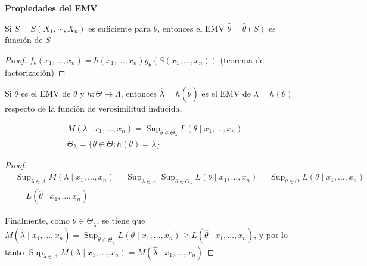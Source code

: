 \textbf{Propiedades del EMV}

\begin{proposición}
Si $S=S\left(X_{1}, \cdots, X_{n}\right)$ es suficiente para $\theta$, entonces el EMV $\hat{\theta}=\hat{\theta}(S)$ es función de $S$
\end{proposición}

\begin{proof}
  $f_{\theta}\left(x_{1}, \ldots, x_{n}\right)=h\left(x_{1}, \ldots, x_{n}\right) g_{\theta}\left(S\left(x_{1}, \ldots, x_{n}\right)\right)$ (teorema de factorización)
\end{proof}

\begin{proposición}
Si $\hat{\theta}$ es el EMV de $\theta$ y $h: \Theta \longrightarrow \Lambda$, entonces $\hat{\lambda}=h(\hat{\theta})$ es el EMV de $\lambda=h(\theta)$ respecto de la función de verosimilitud inducida,

$$
  \begin{gathered}
    M\left(\lambda \mid x_{1}, \ldots, x_{n}\right)=\operatorname{Sup}_{\theta \in \Theta_{\lambda}} L\left(\theta \mid x_{1}, \ldots, x_{n}\right) \\
    \Theta_{\lambda}=\{\theta \in \Theta: h(\theta)=\lambda\}
  \end{gathered}
$$
\end{proposición}

\begin{proof}
  $$
    \begin{aligned}
       & \operatorname{Sup}_{\lambda \in \Lambda} M\left(\lambda \mid x_{1}, \ldots, x_{n}\right)=\operatorname{Sup}_{\lambda \in \Lambda} \operatorname{Sup}_{\theta \in \Theta_{\lambda}} L\left(\theta \mid x_{1}, \ldots, x_{n}\right)=\operatorname{Sup}_{\theta \in \Theta} L\left(\theta \mid x_{1}, \ldots, x_{n}\right) \\
       & =L\left(\hat{\theta} \mid x_{1}, \ldots, x_{n}\right)
    \end{aligned}
  $$

  Finalmente, como $\hat{\theta} \in \Theta_{\hat{\lambda}}$, se tiene que\\
  $M\left(\hat{\lambda} \mid x_{1}, \ldots,
    x_{n}\right)=\operatorname{Sup}_{\theta \in \Theta_{\hat{\lambda}}}
    L\left(\theta \mid x_{1}, \ldots, x_{n}\right) \geq L\left(\hat{\theta} \mid
    x_{1}, \ldots, x_{n}\right)$, y por lo\\ tanto $\operatorname{Sup}_{\lambda \in
      \Lambda} M\left(\lambda \mid x_{1}, \ldots, x_{n}\right)=M\left(\hat{\lambda}
    \mid x_{1}, \ldots, x_{n}\right)$

\end{proof}

